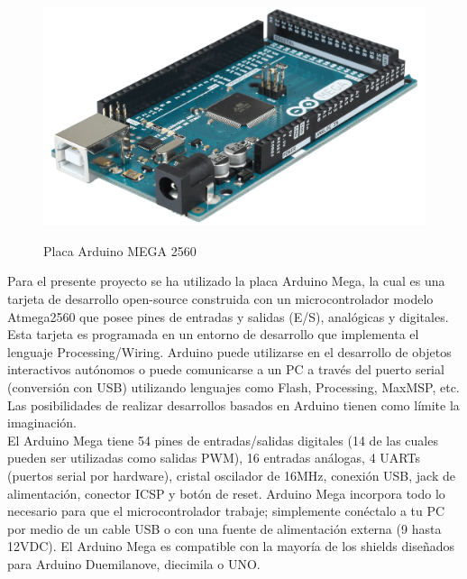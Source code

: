 \begin{figure}[H]
  \begin{center}
    \includegraphics[scale=0.07]{imagenes/arduino_mega.png}\\
    \caption{Placa Arduino MEGA 2560}
  \end{center}
\end{figure}


Para el presente proyecto se ha utilizado la placa Arduino Mega, la cual es una tarjeta de desarrollo open-source construida con un microcontrolador modelo Atmega2560 que posee 
pines de entradas y salidas (E/S), analógicas y digitales. Esta tarjeta es programada en un entorno de desarrollo que implementa el lenguaje Processing/Wiring. Arduino puede
utilizarse en el desarrollo de objetos interactivos autónomos o puede comunicarse a un PC a través del puerto serial (conversión con USB) utilizando lenguajes como Flash,
Processing, MaxMSP, etc. Las posibilidades de realizar desarrollos basados en Arduino tienen como límite la imaginación.\\

El Arduino Mega tiene 54 pines de entradas/salidas digitales (14 de las cuales pueden ser utilizadas como salidas PWM), 16 entradas análogas, 4 UARTs (puertos serial por
hardware), cristal oscilador de 16MHz, conexión USB, jack de alimentación, conector ICSP y botón de reset.  Arduino Mega incorpora todo lo necesario para que el microcontrolador
trabaje; simplemente conéctalo a tu PC por medio de un cable USB o con una fuente de alimentación externa (9 hasta 12VDC). El Arduino Mega es compatible con la mayoría de los 
shields diseñados para Arduino Duemilanove, diecimila o UNO.

